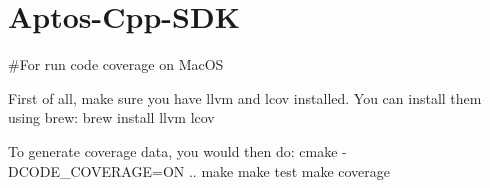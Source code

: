 \chapter{Aptos-\/\+Cpp-\/\+SDK}
\hypertarget{md__r_e_a_d_m_e}{}\label{md__r_e_a_d_m_e}
\label{md__r_e_a_d_m_e_autotoc_md0}%
%
 \#\+For run code coverage on Mac\+OS

First of all, make sure you have llvm and lcov installed. You can install them using brew\+: brew install llvm lcov

To generate coverage data, you would then do\+: cmake -\/DCODE\+\_\+\+COVERAGE=ON .. make make test make coverage 